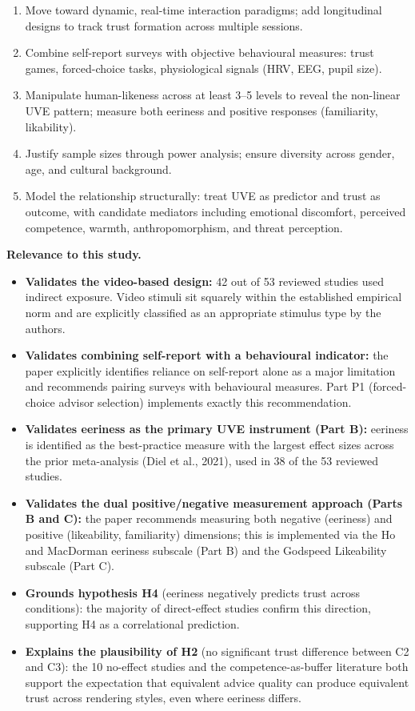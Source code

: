 \documentclass[11pt, a4paper]{article}
\begin{document}
\begin{enumerate}[leftmargin=2.5em]
  \item Move toward dynamic, real-time interaction paradigms; add longitudinal designs to track trust formation across multiple sessions.
  \item Combine self-report surveys with objective behavioural measures: trust games, forced-choice tasks, physiological signals (HRV, EEG, pupil size).
  \item Manipulate human-likeness across at least 3--5 levels to reveal the non-linear UVE pattern; measure both eeriness and positive responses (familiarity, likability).
  \item Justify sample sizes through power analysis; ensure diversity across gender, age, and cultural background.
  \item Model the relationship structurally: treat UVE as predictor and trust as outcome, with candidate mediators including emotional discomfort, perceived competence, warmth, anthropomorphism, and threat perception.
\end{enumerate}

\textbf{Relevance to this study.}

\begin{itemize}[leftmargin=2em]
  \item \textbf{Validates the video-based design:} 42 out of 53 reviewed studies used indirect exposure. Video stimuli sit squarely within the established empirical norm and are explicitly classified as an appropriate stimulus type by the authors.
  \item \textbf{Validates combining self-report with a behavioural indicator:} the paper explicitly identifies reliance on self-report alone as a major limitation and recommends pairing surveys with behavioural measures. Part P1 (forced-choice advisor selection) implements exactly this recommendation.
  \item \textbf{Validates eeriness as the primary UVE instrument (Part B):} eeriness is identified as the best-practice measure with the largest effect sizes across the prior meta-analysis (Diel et al., 2021), used in 38 of the 53 reviewed studies.
  \item \textbf{Validates the dual positive/negative measurement approach (Parts B and C):} the paper recommends measuring both negative (eeriness) and positive (likeability, familiarity) dimensions; this is implemented via the Ho and MacDorman eeriness subscale (Part B) and the Godspeed Likeability subscale (Part C).
  \item \textbf{Grounds hypothesis H4} (eeriness negatively predicts trust across conditions): the majority of direct-effect studies confirm this direction, supporting H4 as a correlational prediction.
  \item \textbf{Explains the plausibility of H2} (no significant trust difference between C2 and C3): the 10 no-effect studies and the competence-as-buffer literature both support the expectation that equivalent advice quality can produce equivalent trust across rendering styles, even where eeriness differs.
\end{itemize}
\end{document}
